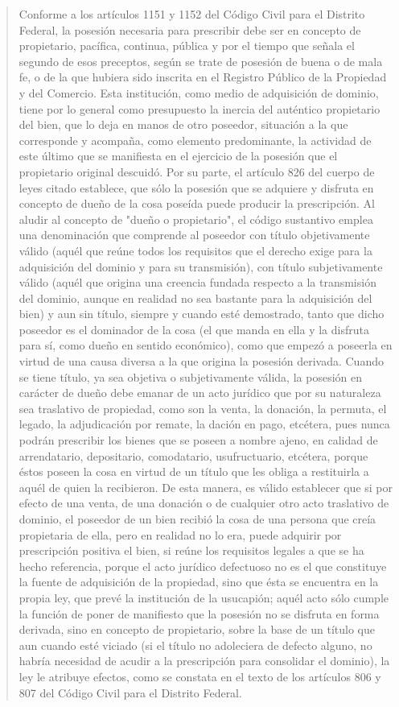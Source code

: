 \documentclass[11pt,a4paper]{article}
\begin{document}
\begin{quote}
Conforme a los artículos 1151 y 1152 del Código Civil para el Distrito Federal, la posesión necesaria
para prescribir debe ser en concepto de propietario, pacífica, continua, pública y por el tiempo que
señala el segundo de esos preceptos, según se trate de posesión de buena o de mala fe, o de la
que hubiera sido inscrita en el Registro Público de la Propiedad y del Comercio. Esta institución,
como medio de adquisición de dominio, tiene por lo general como presupuesto la inercia del
auténtico propietario del bien, que lo deja en manos de otro poseedor, situación a la que
corresponde y acompaña, como elemento predominante, la actividad de este último que se
manifiesta en el ejercicio de la posesión que el propietario original descuidó. Por su parte, el artículo
826 del cuerpo de leyes citado establece, que sólo la posesión que se adquiere y disfruta en
concepto de dueño de la cosa poseída puede producir la prescripción. Al aludir al concepto de
"dueño o propietario", el código sustantivo emplea una denominación que comprende al poseedor
con título objetivamente válido (aquél que reúne todos los requisitos que el derecho exige para la
adquisición del dominio y para su transmisión), con título subjetivamente válido (aquél que origina
una creencia fundada respecto a la transmisión del dominio, aunque en realidad no sea bastante
para la adquisición del bien) y aun sin título, siempre y cuando esté demostrado, tanto que dicho
poseedor es el dominador de la cosa (el que manda en ella y la disfruta para sí, como dueño en
sentido económico), como que empezó a poseerla en virtud de una causa diversa a la que origina la
posesión derivada. Cuando se tiene título, ya sea objetiva o subjetivamente válida, la posesión en
carácter de dueño debe emanar de un acto jurídico que por su naturaleza sea traslativo de
propiedad, como son la venta, la donación, la permuta, el legado, la adjudicación por remate, la
dación en pago, etcétera, pues nunca podrán prescribir los bienes que se poseen a nombre ajeno,
en calidad de arrendatario, depositario, comodatario, usufructuario, etcétera, porque éstos poseen la
cosa en virtud de un título que les obliga a restituirla a aquél de quien la recibieron. De esta manera,
es válido establecer que si por efecto de una venta, de una donación o de cualquier otro acto
traslativo de dominio, el poseedor de un bien recibió la cosa de una persona que creía propietaria
de ella, pero en realidad no lo era, puede adquirir por prescripción positiva el bien, si reúne los
requisitos legales a que se ha hecho referencia, porque el acto jurídico defectuoso no es el que
constituye la fuente de adquisición de la propiedad, sino que ésta se encuentra en la propia ley, que
prevé la institución de la usucapión; aquél acto sólo cumple la función de poner de manifiesto que la
posesión no se disfruta en forma derivada, sino en concepto de propietario, sobre la base de un
título que aun cuando esté viciado (si el título no adoleciera de defecto alguno, no habría necesidad
de acudir a la prescripción para consolidar el dominio), la ley le atribuye efectos, como se constata
en el texto de los artículos 806 y 807 del Código Civil para el Distrito Federal.



\end{quote}
\end{document}
